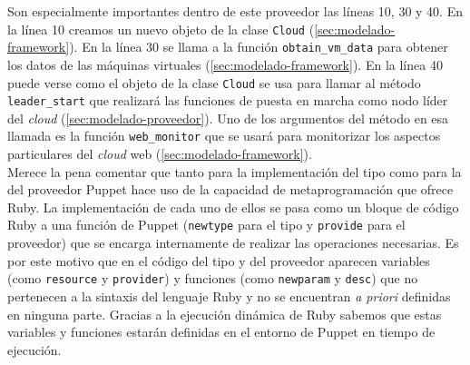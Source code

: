 Son especialmente importantes dentro de este proveedor las líneas 10, 30 y 40. En la línea 10 creamos un nuevo objeto de la clase \texttt{Cloud} (\ref{sec:modelado-framework}). En la línea 30 se llama a la función \texttt{obtain\_vm\_data} para obtener los datos de las máquinas virtuales (\ref{sec:modelado-framework}). En la línea 40 puede verse como el objeto de la clase \texttt{Cloud} se usa para llamar al método \texttt{leader\_start} que realizará las funciones de puesta en marcha como nodo líder del \emph{cloud} (\ref{sec:modelado-proveedor}). Uno de los argumentos del método en esa llamada es la función \texttt{web\_monitor} que se usará para monitorizar los aspectos particulares del \emph{cloud} web (\ref{sec:modelado-framework}). \\

Merece la pena comentar que tanto para la implementación del tipo como para la del proveedor Puppet hace uso de la capacidad de metaprogramación que ofrece Ruby. La implementación de cada uno de ellos se pasa como un bloque de código Ruby a una función de Puppet (\texttt{newtype} para el tipo y \texttt{provide} para el proveedor) que se encarga internamente de realizar las operaciones necesarias. Es por este motivo que en el código del tipo y del proveedor aparecen variables (como \texttt{resource} y \texttt{provider}) y funciones (como \texttt{newparam} y \texttt{desc}) que no pertenecen a la sintaxis del lenguaje Ruby y no se encuentran \emph{a priori} definidas en ninguna parte. Gracias a la ejecución dinámica de Ruby sabemos que estas variables y funciones estarán definidas en el entorno de Puppet en tiempo de ejecución.
